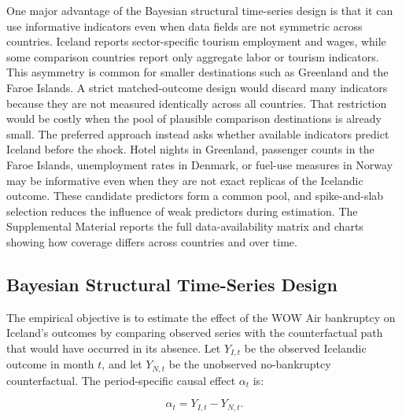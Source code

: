 \documentclass[12pt]{article}
\begin{document}
\clearpage\clearpage

One major advantage of the Bayesian structural time-series design is that it can use informative indicators even when data fields are not symmetric across countries. Iceland reports sector-specific tourism employment and wages, while some comparison countries report only aggregate labor or tourism indicators. This asymmetry is common for smaller destinations such as Greenland and the Faroe Islands. A strict matched-outcome design would discard many indicators because they are not measured identically across all countries. That restriction would be costly when the pool of plausible comparison destinations is already small. The preferred approach instead asks whether available indicators predict Iceland before the shock. Hotel nights in Greenland, passenger counts in the Faroe Islands, unemployment rates in Denmark, or fuel-use measures in Norway may be informative even when they are not exact replicas of the Icelandic outcome. These candidate predictors form a common pool, and spike-and-slab selection reduces the influence of weak predictors during estimation. The Supplemental Material reports the full data-availability matrix and charts showing how coverage differs across countries and over time.

\subsection{Bayesian Structural Time-Series Design}\label{sec:bsts_design}

The empirical objective is to estimate the effect of the WOW Air bankruptcy on Iceland's outcomes by comparing observed series with the counterfactual path that would have occurred in its absence. Let $Y_{I,t}$ be the observed Icelandic outcome in month $t$, and let $Y_{N,t}$ be the unobserved no-bankruptcy counterfactual. The period-specific causal effect $\alpha_t$ is:

\[\alpha_t = Y_{I,t} - Y_{N,t}.\]
\end{document}
